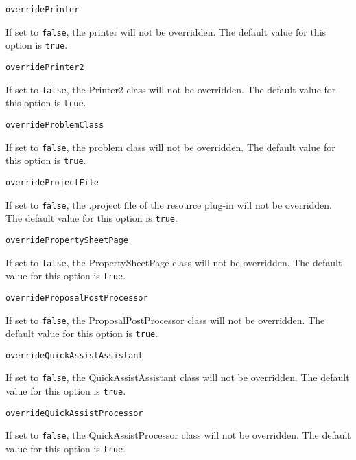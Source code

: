 \noindent\texttt{overridePrinter}
\begin{myindentpar}{1cm}
If set to \texttt{false}, the printer will not be overridden. The default value for this option is \texttt{true}.
\end{myindentpar}

\noindent\texttt{overridePrinter2}
\begin{myindentpar}{1cm}
If set to \texttt{false}, the Printer2 class will not be overridden. The default value for this option is \texttt{true}.
\end{myindentpar}

\noindent\texttt{overrideProblemClass}
\begin{myindentpar}{1cm}
If set to \texttt{false}, the problem class will not be overridden. The default value for this option is \texttt{true}.
\end{myindentpar}

\noindent\texttt{overrideProjectFile}
\begin{myindentpar}{1cm}
If set to \texttt{false}, the .project file of the resource plug-in will not be overridden. The default value for this option is \texttt{true}.
\end{myindentpar}

\noindent\texttt{overridePropertySheetPage}
\begin{myindentpar}{1cm}
If set to \texttt{false}, the PropertySheetPage class will not be overridden. The default value for this option is \texttt{true}.
\end{myindentpar}

\noindent\texttt{overrideProposalPostProcessor}
\begin{myindentpar}{1cm}
If set to \texttt{false}, the ProposalPostProcessor class will not be overridden. The default value for this option is \texttt{true}.
\end{myindentpar}

\noindent\texttt{overrideQuickAssistAssistant}
\begin{myindentpar}{1cm}
If set to \texttt{false}, the QuickAssistAssistant class will not be overridden. The default value for this option is \texttt{true}.
\end{myindentpar}

\noindent\texttt{overrideQuickAssistProcessor}
\begin{myindentpar}{1cm}
If set to \texttt{false}, the QuickAssistProcessor class will not be overridden. The default value for this option is \texttt{true}.
\end{myindentpar}

